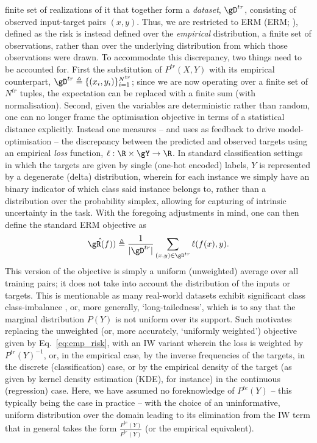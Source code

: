 finite set of realizations of it that together form a \emph{dataset}, \( \gD^{tr} \), consisting of
observed input-target pairs \( (x, y) \). 
%
Thus, we are restricted to \acl{ERM} (\acs{ERM}; \cite{vapnik1991principles}), defined as the risk
is instead defined over the \emph{empirical} distribution, a finite set of observations, rather
than over the underlying distribution from which those observations were drawn.
%
%
To accommodate this discrepancy, two things need to be accounted for. 
%
First the substitution of \( P^{tr}(X, Y) \) with its empirical counterpart, \( \gD^{tr} \triangleq
\{(x_i, y_i) \}_{i=1}^{N^{tr}} \); since we are now operating over a finite set of \( N^{tr} \)
tuples, the expectation can be replaced with a finite sum (with normalisation). 
%
Second, given the variables are deterministic rather than random, one can no longer frame the
optimisation objective in terms of a statistical distance explicitly. 
%
Instead one measures -- and uses as feedback to drive model-optimisation -- the discrepancy between
the predicted and observed targets using an empirical \emph{loss} function, \( \ell: \R \times \gY
\to \R \). 
%
In standard classification settings in which the targets are given by single (one-hot encoded)
labels, \( Y \) is represented by a degenerate (delta) distribution, wherein for each instance we
simply have an binary indicator of which class said instance belongs to, rather than a distribution
over the probability simplex, allowing for capturing of intrinsic uncertainty in the task.
%
With the foregoing adjustments in mind, one can then define the standard \ac{ERM} objective as
\begin{equation*}\label{eq:emp_risk} 
    \hat{\gR(f)}) \triangleq \frac{1}{|\gD^{tr}|}  \sum_{(x, y) \in \gD^{tr}} \ell (f(x), y). 
%
\end{equation*}
%
This version of the objective is simply a uniform (unweighted) average over all training pairs; it
does not take into account the distribution of the inputs or targets.
%
%
This is mentionable as many real-world datasets exhibit significant class class-imbalance
\citep{zhu2014capturing, van2017devil}, or, more generally, `long-tailedness', which is to say that
the marginal distribution \( P(Y) \) is not uniform over its support.
Such motivates replacing the unweighted (or, more accurately, `uniformly weighted') objective given
by Eq.~\ref{eq:emp_risk}, with an \ac{IW} variant wherein the loss is weighted
by \( P^{tr}(Y)^{-1} \), or, in the empirical case, by the inverse frequencies of the targets, in
the discrete (classification) case, or by the empirical density of the target (as given by kernel
density estimation (KDE), for instance) in the continuous (regression) case.
Here, we have assumed no foreknowledge of \( P^{te}(Y) \) -- this typically being the case in
practice -- with the choice of an uninformative, uniform distribution over the domain leading to
its elimination from the \ac{IW} term that in general takes the form \( \frac{ P^{te}(Y) }{
P^{tr}(Y) } \) (or the empirical equivalent).

